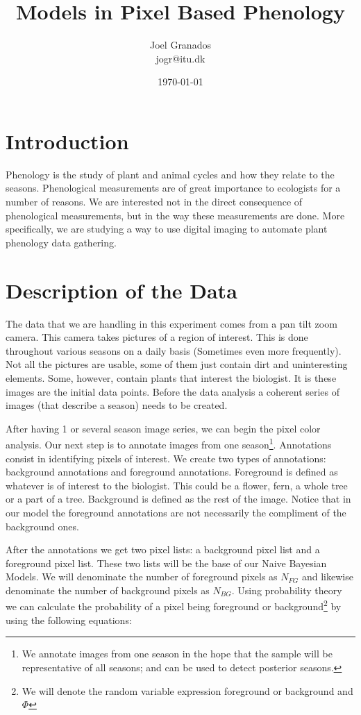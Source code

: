 \documentclass[a4paper,12pt]{report}
\begin{document}
\title{Models in Pixel Based Phenology}
\author{Joel Granados \\ jogr@itu.dk}
\date{ \today }

\maketitle

\section*{Introduction}
Phenology is the study of plant and animal cycles and how they relate to the
seasons. Phenological measurements are of great importance to ecologists for a
number of reasons. We are interested not in the direct consequence of
phenological measurements, but in the way these measurements are done. More
specifically, we are studying a way to use digital imaging to automate plant
phenology data gathering.

\section{Description of the Data}
The data that we are handling in this experiment comes from a pan tilt zoom
camera. This camera takes pictures of a region of interest. This is done
throughout various seasons on a daily basis (Sometimes even more frequently).
Not all the pictures are usable, some of them just contain dirt and
uninteresting elements. Some, however, contain plants that interest the
biologist. It is these images are the initial data points. Before the data
analysis a coherent series of images (that describe a season) needs to be
created.

After having 1 or several season image series, we can begin the pixel color
analysis. Our next step is to annotate images from one season\footnote{We
annotate images from one season in the hope that the sample will be
representative of all seasons; and can be used to detect posterior seasons.}.
Annotations consist in identifying pixels of interest.
We create two types of annotations: background annotations and foreground
annotations. Foreground is defined as whatever is of interest to
the biologist. This could be a flower, fern, a whole tree or a part of a tree.
Background is defined as the rest of the image. Notice that in our model the
foreground annotations are not necessarily the compliment of the background
ones.

After the annotations we get two pixel lists: a background pixel list and a
foreground pixel list. These two lists will be the base of our Naive Bayesian
Models. We will denominate the number of foreground pixels as $N_{FG}$ and
likewise denominate the number of background pixels as $N_{BG}$. Using probability
theory  we can calculate
the probability of a pixel being foreground or background\footnote{We will
denote the random variable expression foreground or background and $\Phi$}
by using the following equations:
\end{document}
